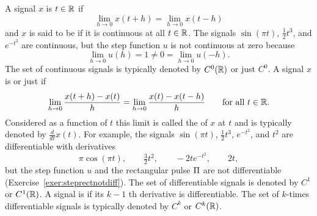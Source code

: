 A signal $x$ is  $t \in {\mathbb R}$ if
\[
\lim_{h \to 0} x(t + h) = \lim_{h \to 0} x(t-h)
\]
and $x$ is said to be  if it is continuous at all $t \in {\mathbb R}$.  The signals $\sin( \pi t)$, $\frac{1}{2} t^3$, and $e^{-t^2}$ are continuous, but the step function $u$ is not continuous at zero because
\[
\lim_{h \to 0} u(h) = 1 \neq 0 = \lim_{h \to 0} u(-h).
\]
The set of continuous signals is typically denoted by $C^0({\mathbb R})$ or just $C^0$.  A signal $x$ is  or just  if
\[
\lim_{h \to 0} \frac{x(t + h) - x(t)}{h} = \lim_{h \to 0} \frac{x(t) - x(t-h)}{h} \qquad \text{for all $t \in {\mathbb R}$}.
\]
Considered as a function of $t$ this limit is called the  of $x$ at $t$ and is typically denoted by $\frac{d}{dt} x(t)$.  For example, the signals $\sin( \pi t)$, $\frac{1}{2} t^3$, $e^{-t^2}$, and $t^2$ are differentiable with derivatives
\[
\pi \cos(\pi t), \qquad \tfrac{3}{2} t^{2}, \qquad -2t e^{-t^2}, \qquad 2t,
\] 
but the step function $u$ and the rectangular pulse $\Pi$ are not differentiable (Exercise~\ref{exer:steprectnotdiff}).  The set of differentiable signals is denoted by $C^1$ or $C^1({\mathbb R})$.  A signal is  if its $k-1$ th derivative is differentiable.  The set of $k$-times differentiable signals is typically denoted by $C^k$ or $C^k({\mathbb R})$.


